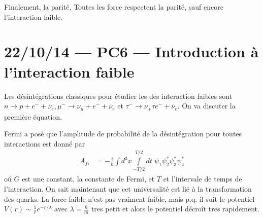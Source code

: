 \documentclass[10pt]{report}
\begin{document}
Finalement, la parit\'e, Toutes les force respectent la parit\'e, sauf encore l'interaction faible.
\chapter{22/10/14 --- PC6 --- Introduction \`a l'interaction faible}

Les d\'esint\'egrations classiques pour \'etudier les des interaction faibles sont $n \to p + e^{-} + \overline{\nu}_e, \mu^- \to \nu_\mu  + e^-  + \overline{\nu}_e$ et $\tau^- \to \nu_ + \tau e^-  + \overline{\nu}_e$. On va discuter la premi\`ere \'equation. 

Fermi a pos\'e que l'amplitude de probabilit\'e de la d\'esint\'egration pour toutes interactions est donn\'e par
\begin{align}
    A_{fi} &= -\frac{i}{\hbar}\int d^3x \int\limits_{-T/2}^{T/2}dt\;\psi_1\psi_2^*\psi_3^*\psi_4^*\label{22.10.Fermi}
\end{align}
o\'u $G$ est une constant, la constante de Fermi, et $T$ et l'intervale de temps de l'interaction. On sait maintenant que cet universalit\'e est li\'e \`a la transformation des quarks. La force faible n'est pas vraiment faible, mais p.q. il suit le potentiel $V(r) \sim \frac{1}{r}e^{-r/\lambda}$ avec $\lambda = \frac{\hbar}{m}$ tres petit et alors le potentiel d\'ecro\^it tres rapidement. 
\end{document}
